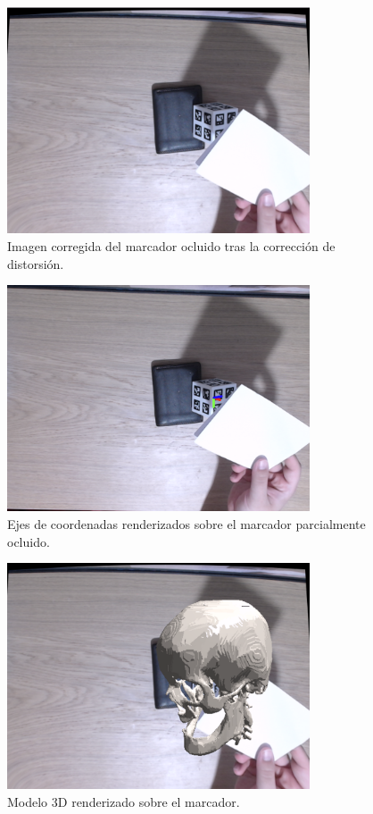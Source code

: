 \begin{figure}[H]
	\centering
	\includegraphics[width=0.8\textwidth]{imaxes/ocluded_undistorted.png}
	\caption{Imagen corregida del marcador ocluido tras la corrección de distorsión.}
	\label{fig:ocluded_undistorted}
\end{figure}

\begin{figure}[H]
	\centering
	\includegraphics[width=0.8\textwidth]{imaxes/ocluded_cube_axis.png}
	\caption{Ejes de coordenadas renderizados sobre el marcador parcialmente ocluido.}
	\label{fig:ocluded_axes}
\end{figure}

\begin{figure}[H]
	\centering
	\includegraphics[width=0.8\textwidth]{imaxes/ocluded_opengl_render.png}
	\caption{Modelo 3D renderizado sobre el marcador.}
	\label{fig:ocluded_render}
\end{figure}